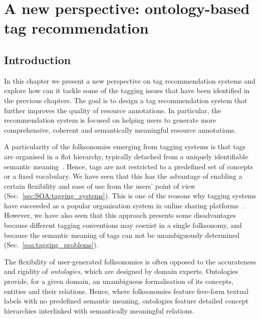 
\chapter[A new perspective: ontology-based tag recommendation][A new pers.: ontology-based tag rec.]{A new perspective: ontology-based tag recommendation}
\label{sec:ontology}

\section{Introduction}
\label{sec:ontology:introduction}

In this chapter we present a new perspective on tag recommendation systems and explore how can it tackle some of the tagging issues that have been identified in the previous chapters. 
The goal is to design a tag recommendation system that further improves the quality of resource annotations. 
In particular, the recommendation system is focused on helping users to generate more comprehensive, coherent and semantically meaningful resource annotations.

A particularity of the folksonomies emerging from tagging systems is that tags are organised in a flat hierarchy, typically detached from a uniquely identifiable semantic meaning~\citep{golder2006,halpin2006}. Hence, tags are not restricted to a predefined set of concepts or a fixed vocabulary.
We have seen that this has the advantage of enabling a certain flexibility and ease of use from the users' point of view (Sec.~\ref{sec:SOA:tagging_systems}).
This is one of the reasons why  tagging systems have succeeded as a popular organisation system in online sharing platforms~\citep{shirky2005ontology,halpin2006,Cattuto2006}. 
However, we have also seen that this approach presents some disadvantages because different tagging conventions may coexist in a single folksonomy, and because the semantic meaning of tags can not be unambiguously determined (Sec.~\ref{soa:tagging_problems}).

The flexibility of user-generated folksonomies is often opposed to the accurateness and rigidity of \emph{ontologies}, which are designed by domain experts.
Ontologies provide, for a given domain, an unambiguous formalisation of its concepts, entities and their relations. 
Hence, where folksonomies feature free-form textual labels with no predefined semantic meaning, ontologies feature detailed concept hierarchies interlinked with semantically meaningful relations.

